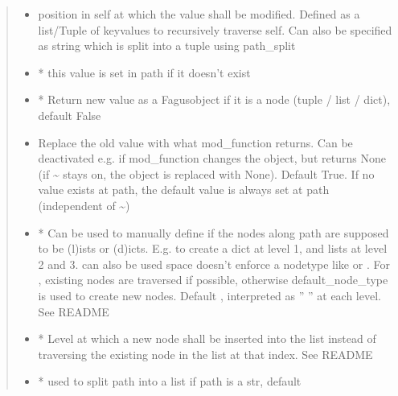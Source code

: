 \documentclass[a4paper,10pt,english]{sphinxmanual}
\begin{document}
\begin{fulllineitems}
\begin{fulllineitems}
\begin{quote}
\begin{description}
\begin{itemize}
\item {}
\sphinxAtStartPar
{} \textendash{} position in self at which the value shall be modified. Defined as a list/Tuple of key\sphinxhyphen{}values to
recursively traverse self. Can also be specified as string which is split into a tuple using path\_split

\item {}
\sphinxAtStartPar
{} \textendash{} * this value is set in path if it doesn’t exist

\item {}
\sphinxAtStartPar
{} \textendash{} * Return new value as a Fagus\sphinxhyphen{}object if it is a node (tuple / list / dict), default False

\item {}
\sphinxAtStartPar
{} \textendash{} Replace the old value with what mod\_function returns. Can be deactivated e.g. if mod\_function
changes the object, but returns None (if \textasciitilde{} stays on, the object is replaced with None). Default True.
If no value exists at path, the default value is always set at path (independent of \textasciitilde{})

\item {}
\sphinxAtStartPar
{} \textendash{} * Can be used to manually define if the nodes along path are supposed to be (l)ists or
(d)icts. E.g.  to create a dict at level 1, and lists at level 2 and 3.  can also be
used \textendash{} space doesn’t enforce a node\sphinxhyphen{}type like  or . For , existing nodes are
traversed if possible, otherwise default\_node\_type is used to create new nodes. Default ,
interpreted as ” ” at each level. See README

\item {}
\sphinxAtStartPar
{} \textendash{} * Level at which a new node shall be inserted into the list instead of traversing the
existing node in the list at that index. See README

\item {}
\sphinxAtStartPar
{} \textendash{} * used to split path into a list if path is a str, default 


\end{itemize}
\end{description}
\end{quote}
\end{fulllineitems}
\end{fulllineitems}
\end{document}
